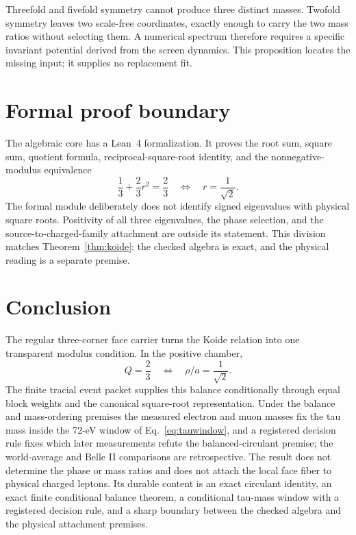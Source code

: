 \documentclass[11pt]{article}
\theoremstyle{remark}
\begin{document}
Threefold and fivefold symmetry cannot produce three distinct masses.
Twofold symmetry leaves two scale-free coordinates, exactly enough to carry
the two mass ratios without selecting them. A numerical spectrum therefore
requires a specific invariant potential derived from the screen dynamics.
This proposition locates the missing input; it supplies no replacement fit.

\section{Formal proof boundary}

The algebraic core has a Lean~4 formalization. It proves the root sum, square
sum, quotient formula, reciprocal-square-root identity, and the
nonnegative-modulus equivalence
\[
\frac13+\frac23r^2=\frac23
\quad\Longleftrightarrow\quad
r=\frac1{\sqrt2}.
\]
The formal module deliberately does not identify signed eigenvalues with
physical square roots. Positivity of all three eigenvalues, the phase
selection, and the source-to-charged-family attachment are outside its
statement. This division matches Theorem~\ref{thm:koide}: the checked algebra
is exact, and the physical reading is a separate premise.

\section{Conclusion}

The regular three-corner face carrier turns the Koide relation into one
transparent modulus condition. In the positive chamber,
\[
Q=\frac23
\quad\Longleftrightarrow\quad
\rho/a=\frac1{\sqrt2}.
\]
The finite tracial event packet supplies this balance conditionally through
equal block weights and the canonical square-root representation. Under the
balance and mass-ordering premises the measured electron and muon masses
fix the tau mass inside the 72-eV window of Eq.~\eqref{eq:tauwindow}, and
a registered decision rule fixes which later measurements refute the
balanced-circulant premise; the world-average and Belle II comparisons are
retrospective. The result does not determine the phase or mass ratios and does
not attach the local face fiber to physical charged leptons. Its durable
content is an exact circulant identity, an exact finite conditional
balance theorem, a conditional tau-mass window with a registered decision
rule, and a sharp boundary between the checked algebra and the physical
attachment premises.
\end{document}
